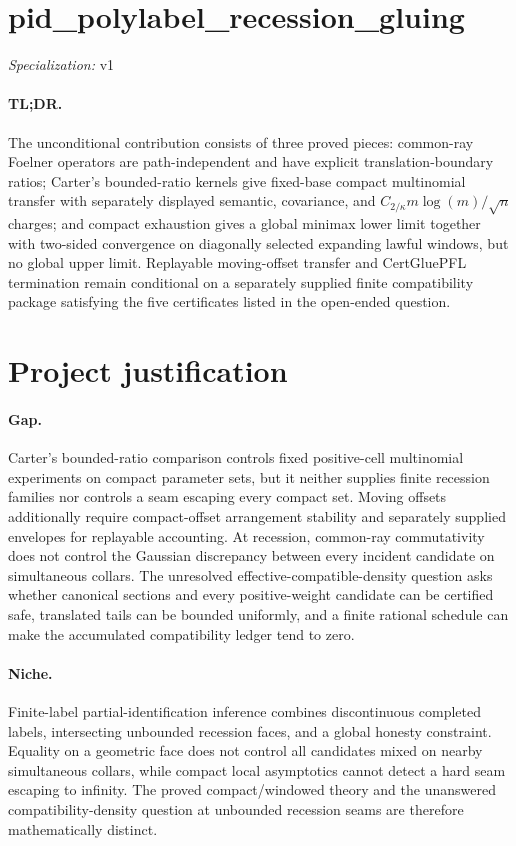 \documentclass{article}
\begin{document}
\sloppy

\section*{pid\_\allowbreak{}polylabel\_\allowbreak{}recession\_\allowbreak{}gluing}

\noindent\textit{Specialization:} v1\par

\paragraph{TL;DR.} The unconditional contribution consists of three proved pieces: common-ray Foelner operators are path-independent and have explicit translation-boundary ratios; Carter's bounded-ratio kernels give fixed-base compact multinomial transfer with separately displayed semantic, covariance, and \(C_{2/\kappa}m\log(m)/\sqrt n\) charges; and compact exhaustion gives a global minimax lower limit together with two-sided convergence on diagonally selected expanding lawful windows, but no global upper limit. Replayable moving-offset transfer and CertGluePFL termination remain conditional on a separately supplied finite compatibility package satisfying the five certificates listed in the open-ended question.

\section{Project justification}

\paragraph{Gap.} Carter's bounded-ratio comparison controls fixed positive-cell multinomial experiments on compact parameter sets, but it neither supplies finite recession families nor controls a seam escaping every compact set. Moving offsets additionally require compact-offset arrangement stability and separately supplied envelopes for replayable accounting. At recession, common-ray commutativity does not control the Gaussian discrepancy between every incident candidate on simultaneous collars. The unresolved effective-compatible-density question asks whether canonical sections and every positive-weight candidate can be certified safe, translated tails can be bounded uniformly, and a finite rational schedule can make the accumulated compatibility ledger tend to zero.

\paragraph{Niche.} Finite-label partial-identification inference combines discontinuous completed labels, intersecting unbounded recession faces, and a global honesty constraint. Equality on a geometric face does not control all candidates mixed on nearby simultaneous collars, while compact local asymptotics cannot detect a hard seam escaping to infinity. The proved compact/windowed theory and the unanswered compatibility-density question at unbounded recession seams are therefore mathematically distinct.
\end{document}
